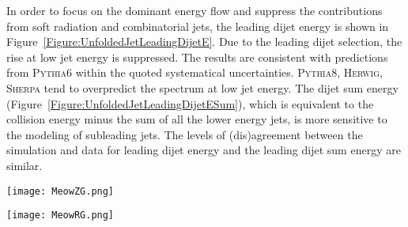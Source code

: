 \documentclass[aps,preprint,superscriptaddress,groupedaddress]{revtex4}  %
\newcommand{\fixme}[1]{{\color{red} [\textbf{#1}]}}
\newcommand{\sherpa}{\textsc{Sherpa}\xspace}
\newcommand{\herwig}{\textsc{Herwig}\xspace}
\newcommand{\pythia}[1]{\textsc{Pythia}{#1}\xspace}
\begin{document}
In order to focus on the dominant energy flow and suppress the contributions from soft radiation and combinatorial jets, the leading dijet energy is shown in Figure~\ref{Figure:UnfoldedJetLeadingDijetE}. Due to the leading dijet selection, the rise at low jet energy is suppressed. The results are consistent with predictions from \pythia{6} within the quoted systematical uncertainties. \pythia{8}, \herwig, \sherpa tend to overpredict the spectrum at low jet energy. The dijet sum energy (Figure~\ref{Figure:UnfoldedJetLeadingDijetESum}), which is equivalent to the collision energy minus the sum of all the lower energy jets, is more sensitive to the modeling of subleading jets. The levels of (dis)agreement between the simulation and data for leading dijet energy and the leading dijet sum energy are similar.

\begin{figure*}
    \centering
    \texttt{[image: MeowZG.png]}
    \caption{Measured $z_G$ spectra in bins of jet $E$.  The spectrum is self-normalized for each $E$ interval.  The fraction of jets completely groomed away are included in the first bin of each panel.  The data is also compared with predictions from \pythia{6} (red), \pythia{8} (blue), \herwig (green), and \sherpa (purple) generators.}
    \label{Figure:UnfoldedJetZG}
\end{figure*}

\begin{figure*}
    \centering
    \texttt{[image: MeowRG.png]}
    \caption{Measured $R_G$ spectra in bins of jet $E$.  The spectrum is self-normalized for each $E$ interval.  The fraction of jets completely groomed away are included in the first bin of each panel.  The data is also compared with predictions from \pythia{6} (red), \pythia{8} (blue), \herwig (green), and \sherpa (purple) generators.}
    \label{Figure:UnfoldedJetRG}
\end{figure*}
\end{document}
